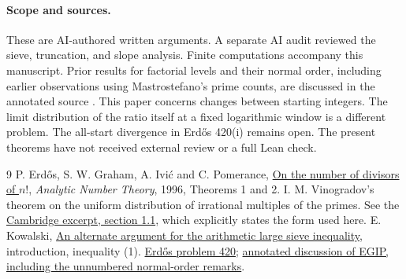 \documentclass[10pt]{article}
\begin{document}
\paragraph{Scope and sources.} These are AI-authored written arguments. A separate AI audit reviewed the sieve, truncation, and slope analysis. Finite computations accompany this manuscript. Prior results for factorial levels and their normal order, including earlier observations using Mastrostefano's prime counts, are discussed in the annotated source \cite{record}. This paper concerns changes between starting integers. The limit distribution of the ratio itself at a fixed logarithmic window is a different problem. The all-start divergence in Erd\H os 420(i) remains open. The present theorems have not received external review or a full Lean check.
\begin{thebibliography}{9}
 P. Erd\H os, S. W. Graham, A. Ivi\'c and C. Pomerance, \href{https://math.dartmouth.edu/~carlp/factorial.pdf}{On the number of divisors of $n!$}, \emph{Analytic Number Theory}, 1996, Theorems 1 and 2.
 I. M. Vinogradov's theorem on the uniform distribution of irrational multiples of the primes. See the \href{https://assets.cambridge.org/97805214/59990/excerpt/9780521459990_excerpt.pdf}{Cambridge excerpt, section 1.1}, which explicitly states the form used here.
 E. Kowalski, \href{https://people.math.ethz.ch/~kowalski/dual-large-sieve.pdf}{An alternate argument for the arithmetic large sieve inequality}, introduction, inequality (1).
 \href{https://www.erdosproblems.com/420}{Erd\H os problem 420}; \href{https://erdosproblems.ai/wiki/library/factorials_binomials/erdos_1996_number_divisors}{annotated discussion of EGIP, including the unnumbered normal-order remarks}.
\end{thebibliography}
\end{document}
